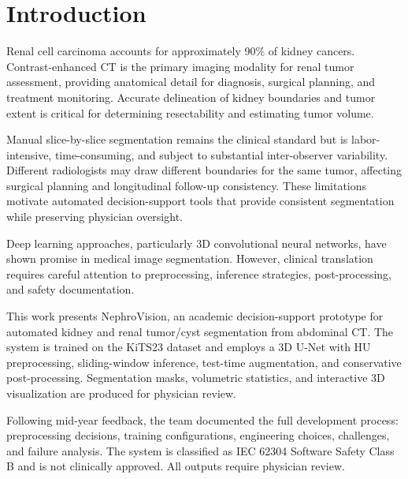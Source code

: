 \section{Introduction}

Renal cell carcinoma accounts for approximately 90\% of kidney cancers. Contrast-enhanced CT is the primary imaging modality for renal tumor assessment, providing anatomical detail for diagnosis, surgical planning, and treatment monitoring. Accurate delineation of kidney boundaries and tumor extent is critical for determining resectability and estimating tumor volume.

Manual slice-by-slice segmentation remains the clinical standard but is labor-intensive, time-consuming, and subject to substantial inter-observer variability. Different radiologists may draw different boundaries for the same tumor, affecting surgical planning and longitudinal follow-up consistency. These limitations motivate automated decision-support tools that provide consistent segmentation while preserving physician oversight.

Deep learning approaches, particularly 3D convolutional neural networks, have shown promise in medical image segmentation. However, clinical translation requires careful attention to preprocessing, inference strategies, post-processing, and safety documentation.

This work presents NephroVision, an academic decision-support prototype for automated kidney and renal tumor/cyst segmentation from abdominal CT. The system is trained on the KiTS23 dataset and employs a 3D U-Net with HU preprocessing, sliding-window inference, test-time augmentation, and conservative post-processing. Segmentation masks, volumetric statistics, and interactive 3D visualization are produced for physician review.

Following mid-year feedback, the team documented the full development process: preprocessing decisions, training configurations, engineering choices, challenges, and failure analysis. The system is classified as IEC 62304 Software Safety Class B and is not clinically approved. All outputs require physician review.
